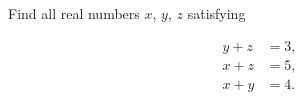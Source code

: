 Find all real numbers $x$, $y$, $z$ satisfying

\begin{align*}
    y+z&=3, \\
x    +z&=5, \\ 
x+y    &=4. 
\end{align*}
